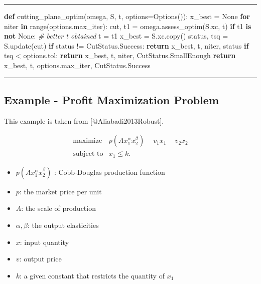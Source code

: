 \documentclass[
]{article}
\newenvironment{Shaded}{}{}
\newcommand{\BuiltInTok}[1]{\textcolor[rgb]{0.00,0.50,0.00}{#1}}
\newcommand{\CommentTok}[1]{\textcolor[rgb]{0.38,0.63,0.69}{\textit{#1}}}
\newcommand{\ControlFlowTok}[1]{\textcolor[rgb]{0.00,0.44,0.13}{\textbf{#1}}}
\newcommand{\KeywordTok}[1]{\textcolor[rgb]{0.00,0.44,0.13}{\textbf{#1}}}
\newcommand{\NormalTok}[1]{#1}
\newcommand{\OperatorTok}[1]{\textcolor[rgb]{0.40,0.40,0.40}{#1}}
\newcommand{\VariableTok}[1]{\textcolor[rgb]{0.10,0.09,0.49}{#1}}
\providecommand{\tightlist}{%
  \setlength{\itemsep}{0pt}\setlength{\parskip}{0pt}}
\begin{document}
\begin{center}\rule{0.5\linewidth}{0.5pt}\end{center}

\begin{Shaded}
\begin{Highlighting}[]
\KeywordTok{def}\NormalTok{ cutting\_plane\_optim(omega, S, t, options}\OperatorTok{=}\NormalTok{Options()):}
\NormalTok{    x\_best }\OperatorTok{=} \VariableTok{None}
    \ControlFlowTok{for}\NormalTok{ niter }\KeywordTok{in} \BuiltInTok{range}\NormalTok{(options.max\_iter):}
\NormalTok{        cut, t1 }\OperatorTok{=}\NormalTok{ omega.assess\_optim(S.xc, t)}
        \ControlFlowTok{if}\NormalTok{ t1 }\KeywordTok{is} \KeywordTok{not} \VariableTok{None}\NormalTok{:  }\CommentTok{\# better t obtained}
\NormalTok{            t }\OperatorTok{=}\NormalTok{ t1}
\NormalTok{            x\_best }\OperatorTok{=}\NormalTok{ S.xc.copy()}
\NormalTok{        status, tsq }\OperatorTok{=}\NormalTok{ S.update(cut)}
        \ControlFlowTok{if}\NormalTok{ status }\OperatorTok{!=}\NormalTok{ CutStatus.Success:}
            \ControlFlowTok{return}\NormalTok{ x\_best, t, niter, status}
        \ControlFlowTok{if}\NormalTok{ tsq }\OperatorTok{\textless{}}\NormalTok{ options.tol:}
            \ControlFlowTok{return}\NormalTok{ x\_best, t, niter, CutStatus.SmallEnough}
    \ControlFlowTok{return}\NormalTok{ x\_best, t, options.max\_iter, CutStatus.Success}
\end{Highlighting}
\end{Shaded}

\begin{center}\rule{0.5\linewidth}{0.5pt}\end{center}

\subsection{Example - Profit Maximization
Problem}\label{example---profit-maximization-problem}

This example is taken from {[}@Aliabadi2013Robust{]}.

\[\begin{array}{ll}
   \text{maximize} & p(A x_1^\alpha x_2^\beta) - v_1 x_1 - v_2 x_2 \\
   \text{subject to}& x_1 \le k.
\end{array}\]

\begin{itemize}
\tightlist
\item
  \(p(A x_1^\alpha x_2^\beta)\) : Cobb-Douglas production function
\item
  \(p\): the market price per unit
\item
  \(A\): the scale of production
\item
  \(\alpha, \beta\): the output elasticities
\item
  \(x\): input quantity
\item
  \(v\): output price
\item
  \(k\): a given constant that restricts the quantity of \(x_1\)
\end{itemize}
\end{document}
